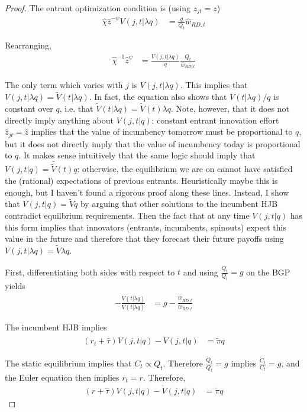 \documentclass[11pt,english]{article}
\begin{document}
\begin{proof}

	The entrant optimization condition is (using $z_{jt} = z$)
	\begin{align}
	\hat{\chi} \hat{z}^{-\psi} V(j,t|\lambda q) &= \frac{q}{Q_t} \hat{w}_{RD,t}
	\end{align}
	
	Rearranging,
	\begin{align}
	\hat{\chi}^{-1} \hat{z}^{\psi} &= \frac{V(j,t|\lambda q)}{q} \frac{Q_t}{\hat{w}_{RD,t}}  \label{constant_vw_ratio}
	\end{align}
	
	The only term which varies with $j$ is $V(j,t|\lambda q)$. This implies that $V(j,t| \lambda q) =  \tilde{V}(t| \lambda q)$. In fact, the equation also shows that $V(t|\lambda q) / q$ is constant over $q$, i.e. that $\tilde{V}(t|\lambda q) = \tilde{V}(t) \lambda q$. Note, however, that it does not directly imply anything about $V(j,t|q)$: constant entrant innovation effort $\hat{z}_{jt} = \hat{z}$ implies that the value of incumbency tomorrow must be proportional to $q$, but it does not directly imply that the value of incumbency today is proportional to $q$. It makes sense intuitively that the same logic should imply that $V(j,t|q) = \bar{\tilde{V}}(t) q$: otherwise, the equilibrium we are on cannot have satisfied the (rational) expectations of previous entrants. Heuristically maybe this is enough, but I haven't found a rigorous proof along these lines. Instead, I show that $V(j,t|q) = \tilde{V}q$ by arguing that other solutions to the incumbent HJB contradict equilbrium requirements. Then the fact that at any time $V(j,t|q)$ has this form implies that innovators (entrants, incumbents, spinouts) expect this value in the future and therefore that they forecast their future payoffs using $V(j,t|\lambda q) = \tilde{V} \lambda q$.
	
	First, differentiating both sides with respect to $t$ and using $\frac{\dot{Q}_t}{Q_t} = g$ on the BGP yields
	\begin{align}
	- \frac{\dot{V}(t|\lambda q)}{V(t|\lambda q)} &= g - \frac{\dot{\hat{w}}_{RD,t}}{\hat{w}_{RD,t}} \label{appendix:eq:freeEntryDifferentiated}
	\end{align}
	
	The incumbent HJB implies
	\begin{align}
	(r_t + \hat{\tau}) V(j,t|q) - \dot{V}(j,t|q) &= \tilde{\pi} q
	\end{align}
	
	The static equilibrium implies that $C_t \propto Q_t$. Therefore $\frac{\dot{Q}_t}{Q_t} = g$ implies $\frac{\dot{C}_t}{C_t} = g$, and the Euler equation then implies $r_t = r$. Therefore, 
	\begin{align}
	(r + \hat{\tau}) V(j,t|q) - \dot{V}(j,t|q) &= \tilde{\pi} q
	\end{align}
	

\end{proof}
\end{document}
